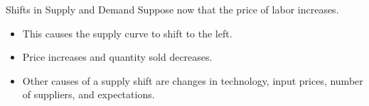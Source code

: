 \documentclass[12pt,t]{beamer}
\begin{document}
\begin{frame}{Shifts in Supply and Demand}
  Suppose now that the price of labor increases. 

  \bigskip
  \pause
  \begin{itemize}
    \item This causes the supply curve to shift to the left.

    \pause
    \item Price increases and quantity sold decreases.

    \item Other causes of a supply shift are changes in technology, input prices, number of suppliers, and expectations.
  \end{itemize}
\end{frame}
\end{document}
